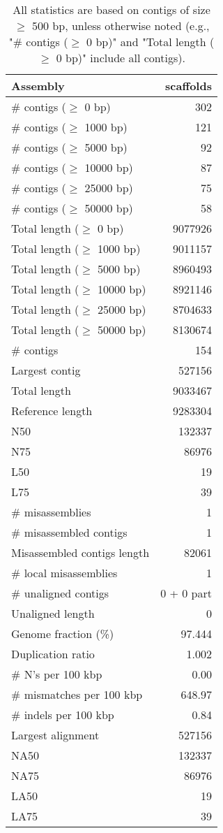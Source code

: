\documentclass[12pt,a4paper]{article}
\begin{document}
\begin{table}[ht]
\begin{center}
\caption{All statistics are based on contigs of size $\geq$ 500 bp, unless otherwise noted (e.g., "\# contigs ($\geq$ 0 bp)" and "Total length ($\geq$ 0 bp)" include all contigs).}
\begin{tabular}{|l*{1}{|r}|}
\hline
Assembly & scaffolds \\ \hline
\# contigs ($\geq$ 0 bp) & 302 \\ \hline
\# contigs ($\geq$ 1000 bp) & 121 \\ \hline
\# contigs ($\geq$ 5000 bp) & 92 \\ \hline
\# contigs ($\geq$ 10000 bp) & 87 \\ \hline
\# contigs ($\geq$ 25000 bp) & 75 \\ \hline
\# contigs ($\geq$ 50000 bp) & 58 \\ \hline
Total length ($\geq$ 0 bp) & 9077926 \\ \hline
Total length ($\geq$ 1000 bp) & 9011157 \\ \hline
Total length ($\geq$ 5000 bp) & 8960493 \\ \hline
Total length ($\geq$ 10000 bp) & 8921146 \\ \hline
Total length ($\geq$ 25000 bp) & 8704633 \\ \hline
Total length ($\geq$ 50000 bp) & 8130674 \\ \hline
\# contigs & 154 \\ \hline
Largest contig & 527156 \\ \hline
Total length & 9033467 \\ \hline
Reference length & 9283304 \\ \hline
N50 & 132337 \\ \hline
N75 & 86976 \\ \hline
L50 & 19 \\ \hline
L75 & 39 \\ \hline
\# misassemblies & 1 \\ \hline
\# misassembled contigs & 1 \\ \hline
Misassembled contigs length & 82061 \\ \hline
\# local misassemblies & 1 \\ \hline
\# unaligned contigs & 0 + 0 part \\ \hline
Unaligned length & 0 \\ \hline
Genome fraction (\%) & 97.444 \\ \hline
Duplication ratio & 1.002 \\ \hline
\# N's per 100 kbp & 0.00 \\ \hline
\# mismatches per 100 kbp & 648.97 \\ \hline
\# indels per 100 kbp & 0.84 \\ \hline
Largest alignment & 527156 \\ \hline
NA50 & 132337 \\ \hline
NA75 & 86976 \\ \hline
LA50 & 19 \\ \hline
LA75 & 39 \\ \hline
\end{tabular}
\end{center}
\end{table}
\end{document}
